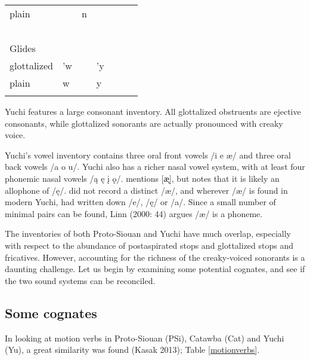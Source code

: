 \documentclass[output=paper]{LSP/langsci}
\begin{document}
\begin{table}[h!]
\begin{tabular}{llllll}
plain                       & ~                   & n                    & ~                       & ~                   & ~                \\
~                           & ~                   & ~                    & ~                       & ~                   & ~                \\
 Glides           & ~                   & ~                    & ~                       & ~                   & ~                \\
glottalized                 & 'w                  & ~                    & 'y                      & ~                   & ~                \\
plain                       & w                   & ~                    & y                       & ~                   & ~                \\ \lspbottomrule
\end{tabular}
\end{table}

Yuchi features a large consonant inventory. All glottalized obstruents are ejective consonants, while glottalized sonorants are actually pronounced with creaky voice. 

Yuchi's vowel inventory contains three oral front vowels /i e \ae/ and three oral back vowels /a o u/. Yuchi also has a richer nasal vowel system, with at least four phonemic nasal vowels /\k{a} \k{e} \k{i} \k{o}/. \citet{Linn2000} mentions [\k{\ae}], but notes that it is likely an allophone of /\k{e}/. \citet{Wagner1934} did not record a distinct /\ae/, and wherever /\ae/ is found in modern Yuchi, \citet{Wagner1934} had written down /e/, /\k{e}/ or /a/. Since a small number of minimal pairs can be found, Linn (2000: 44) argues /\ae/ is a phoneme.

The inventories of both Proto-Siouan and Yuchi have much overlap, especially with respect to the abundance of postaspirated stops and glottalized stops and fricatives. However, accounting for the richness of the creaky-voiced sonorants is a daunting challenge. Let us begin by examining some potential cognates, and see if the two sound systems can be reconciled.

\subsection{Some cognates}
 
In looking at motion verbs in Proto-Siouan (PSi), Catawba (Cat) and Yuchi (Yu), a great similarity was found (Kasak 2013); Table \ref{motionverbs}.
\end{document}
